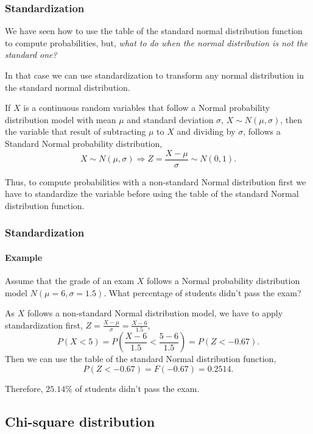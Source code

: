 \begin{frame}
\frametitle{Standardization}
We have seen how to use the table of the standard normal distribution function to compute probabilities, but, \emph{what to do when the normal distribution is not the standard one?}

In that case we can use standardization to transform any normal distribution in the standard normal distribution.

\begin{theorem}[Standardization]
If $X$ is a continuous random variables that follow a Normal probability distribution model with mean $\mu$ and standard deviation $\sigma$, $X\sim N(\mu,\sigma)$, then the variable that result of subtracting $\mu$ to $X$ and dividing by $\sigma$, follows a Standard Normal probability distribution,
\[
X\sim N(\mu,\sigma) \Rightarrow Z=\frac{X-\mu}{\sigma}\sim N(0,1).
\]
\end{theorem}

Thus, to compute probabilities with a non-standard Normal distribution first we have to standardize the variable before 
using the table of the standard Normal distribution function.
\end{frame}


\begin{frame}
\frametitle{Standardization}
\framesubtitle{Example}
Assume that the grade of an exam $X$ follows a Normal probability distribution model $N(\mu=6,\sigma=1.5)$. 
What percentage of students didn't pass the exam?

As $X$ follows a non-standard Normal distribution model, we have to apply standardization first, $Z=\displaystyle
\frac{X-\mu}{\sigma} = \frac{X-6}{1.5}$,
\[
P(X<5) = P\left(\frac{X-6}{1.5}<\frac{5-6}{1.5}\right) = P(Z<-0.67).
\]
Then we can use the table of the standard Normal distribution function,
\[
P(Z<-0.67) = F(-0.67) = 0.2514.
\]

Therefore, $25.14\%$ of students didn't pass the exam.
\end{frame}


\subsection{Chi-square distribution}

